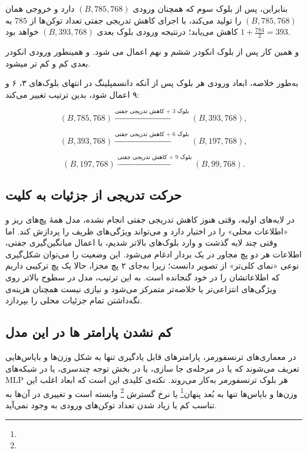 بنابراین، پس از بلوک سوم که همچنان ورودی $(B, 785, 768)$ دارد و خروجی همان $(B, 785, 768)$ را تولید می‌کند، با اجرای کاهش تدریجی  جفتی تعداد توکن‌ها از $785$ به $1 + \frac{784}{2} = 393$ کاهش می‌یابد؛ درنتیجه ورودی بلوک بعدی $(B, 393, 768)$ خواهد بود.

 
و همین کار پس از بلوک انکودر ششم و نهم اعمال می شود.  و همینطور ورودی انکودر بعدی کم و کم تر میشود.

به‌طور خلاصه، ابعاد ورودی هر بلوک پس از آنکه دانسمپلینگ در انتهای بلوک‌های ۳، ۶ و ۹ اعمال شود، بدین ترتیب تغییر می‌کند:

\[
(B, 785, 768) 
\xrightarrow{\text{بلوک 3 + کاهش تدریجی جفتی}} 
(B, 393, 768),
\]

\[
(B, 393, 768) 
\xrightarrow{\text{بلوک 6 + کاهش تدریجی جفتی}} 
(B, 197, 768),
\]

\[
(B, 197, 768) 
\xrightarrow{\text{بلوک 9 + کاهش تدریجی جفتی}} 
(B, 99, 768).
\]



\subsection{حرکت تدریجی از جزئیات به کلیت}

در لایه‌های اولیه، وقتی هنوز کاهش تدریجی جفتی انجام نشده، مدل همۀ پچ‌های ریز و «اطلاعات محلی» را در اختیار دارد و می‌تواند ویژگی‌های ظریف را پردازش کند. اما وقتی چند لایه گذشت و وارد بلوک‌های بالاتر شدیم، با اعمال میانگین‌گیری جفتی، اطلاعات هر دو پچ مجاور در یک بردار ادغام می‌شود. این وضعیت را می‌توان شکل‌گیری نوعی «نمای کلی‌تر» از تصویر دانست؛ زیرا به‌جای ۲ پچ مجزا، حالا یک پچ ترکیبی داریم که اطلاعاتشان را در خود گنجانده است. به این ترتیب، مدل در سطوح بالاتر روی ویژگی‌های انتزاعی‌تر یا خلاصه‌تر متمرکز می‌شود و نیازی نیست همچنان هزینه‌ی نگه‌داشتن تمام جزئیات محلی را بپردازد.

\subsection{کم نشدن پارامتر ها در این مدل}


در معماری‌های ترنسفورمر، پارامترهای قابل یادگیری تنها به شکل وزن‌ها و بایاس‌هایی تعریف می‌شوند که یا در مرحله‌ی جا سازی، یا در بخش توجه چندسری، یا در شبکه‌های MLP هر بلوک ترنسفورمر به‌کار می‌روند. نکته‌ی کلیدی این است که ابعاد اغلب این وزن‌ها و بایاس‌ها تنها به بُعد پنهان\footnote{} یا نرخ گسترش \footnote{} وابسته است و تغییری در آن‌ها به تناسب کم یا زیاد شدن تعداد توکن‌های ورودی به وجود نمی‌آید.



